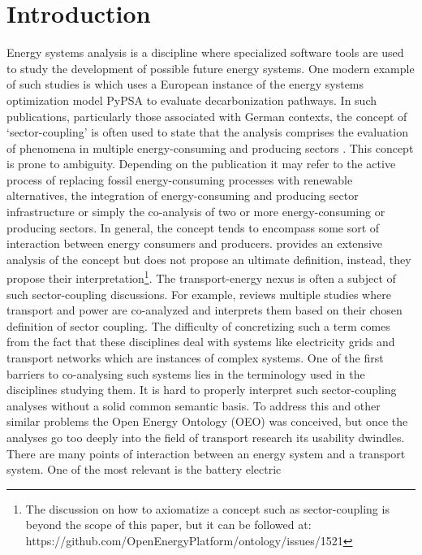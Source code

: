 ﻿\section{Introduction}
\label{introduction}
Energy systems analysis is a discipline where specialized software tools are
used to study the development of possible future energy systems. One modern
example of such studies is \cite{Victoria.2022} which uses a European instance
of the energy systems optimization model PyPSA \cite{Brown.2018} to evaluate
decarbonization pathways. In such publications, particularly those associated
with German contexts, the concept of `sector-coupling' is often used to state
that the analysis comprises the evaluation of phenomena in multiple
energy-consuming and producing sectors \cite{Fridgen.2020}. This concept is
prone to ambiguity. Depending on the publication it may refer to the active
process of replacing fossil energy-consuming processes with renewable
alternatives, the integration of energy-consuming and producing sector
infrastructure or simply the co-analysis of two or more energy-consuming or
producing sectors. In general, the concept tends to encompass some sort of
interaction between energy consumers and producers. \cite{Ramsebner.2021}
provides an extensive analysis of the concept but does not propose an ultimate
definition, instead, they propose their interpretation\footnote{The discussion
on how to axiomatize a concept such as sector-coupling is beyond the scope of
this paper, but it can be followed at:
https://github.com/OpenEnergyPlatform/ontology/issues/1521}. The
transport-energy nexus is often a subject of such sector-coupling discussions.
For example, \cite{Robinius.2017} reviews multiple studies where transport and
power are co-analyzed and interprets them based on their chosen definition of
sector coupling. The difficulty of concretizing such a term comes from the fact
that these disciplines deal with systems like electricity grids and transport
networks which are instances of complex systems. One of the first barriers to
co-analysing such systems lies in the terminology used in the disciplines
studying them. It is hard to properly interpret such sector-coupling analyses
without a solid common semantic basis. To address this and other similar
problems the Open Energy Ontology (OEO) \cite{Booshehri.2021} was conceived, but
once the analyses go too deeply into the field of transport research its
usability dwindles. There are many points of interaction between an energy
system and a transport system. One of the most relevant is the battery electric
